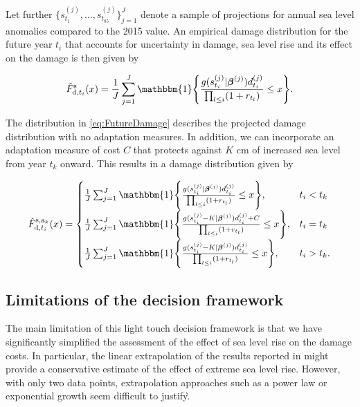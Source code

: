 \documentclass[draft,linenumbers]{agujournal}
\begin{document}
Let further $\{s_{t_1}^{(j)}, \ldots, s_{t_{85}}^{(j)} \}_{j=1}^J$ denote a sample of projections for annual sea level anomalies compared to the 2015 value. An empirical damage distribution for the future year $t_i$ that accounts for uncertainty in damage, sea level rise and its effect on the damage is then given by
\begin{linenomath*}
  \begin{equation}\label{eq:FutureDamage}
    \hat{F}_{\textup{d}, t_i}^\textup{s} (x) = \frac{1}{J} \sum_{j=1}^J \mathbbm{1}\Bigg\{ \frac{g(s_{t_i}^{(j)}| \boldsymbol \beta^{(j)}) d_{t_i}^{(j)}}{\prod_{l \leq i} (1 + r_{t_l})} \leq x \Bigg\}.
  \end{equation}
\end{linenomath*}

The distribution in \eqref{eq:FutureDamage} describes the projected damage distribution with no adaptation measures. In addition, we can incorporate an adaptation measure of cost $C$ that protects against $K$ cm of increased sea level from year $t_k$ onward. This results in a damage distribution given by
\begin{linenomath*}
  \[
  \hat{F}_{\textup{d}, t_i}^{\textup{s}, \textup{a}_k} (x) =
    \begin{cases}
      \frac{1}{J} \sum_{j=1}^J \mathbbm{1}\Bigg\{ \frac{g(s_{t_i}^{(j)}| \boldsymbol \beta^{(j)}) d_{t_i}^{(j)}}{\prod_{l \leq i} (1 + r_{t_l})} \leq x \Bigg\}, & t_i < t_k \\[2ex]
      \frac{1}{J} \sum_{j=1}^J \mathbbm{1}\Bigg\{ \frac{g(s_{t_i}^{(j)} - K| \boldsymbol \beta^{(j)}) d_{t_i}^{(j)} + C}{\prod_{l \leq i} (1 + r_{t_l})} \leq x \Bigg\}, & t_i = t_k \\[2ex]
      \frac{1}{J} \sum_{j=1}^J \mathbbm{1}\Bigg\{ \frac{g(s_{t_i}^{(j)} - K| \boldsymbol \beta^{(j)}) d_{t_i}^{(j)}}{\prod_{l \leq i} (1 + r_{t_l})} \leq x \Bigg\}, & t_i > t_k. \\
    \end{cases}
  \]
\end{linenomath*}

\subsection{Limitations of the decision framework}
The main limitation of this light touch decision framework is that we have significantly simplified the assessment of the effect of sea level rise on the damage costs. In particular, the linear extrapolation of the results reported in \citet{Hallegatte&2013} might provide a conservative estimate of the effect of extreme sea level rise. However, with only two data points, extrapolation approaches such as a power law or exponential growth seem difficult to justify\`.
\end{document}
